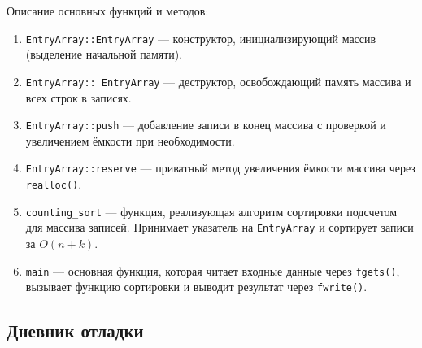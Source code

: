 \documentclass[12pt]{article}
\begin{document}
Описание основных функций и методов:
\begin{enumerate}
\item \texttt{EntryArray::EntryArray} — конструктор, инициализирующий массив (выделение начальной памяти).
\item \texttt{EntryArray::~EntryArray} — деструктор, освобождающий память массива и всех строк в записях.
\item \texttt{EntryArray::push} — добавление записи в конец массива с проверкой и увеличением ёмкости при необходимости.
\item \texttt{EntryArray::reserve} — приватный метод увеличения ёмкости массива через \texttt{realloc()}.
\item \texttt{counting\_sort} — функция, реализующая алгоритм сортировки подсчетом для массива записей. Принимает указатель на \texttt{EntryArray} и сортирует записи за $O(n + k)$.
\item \texttt{main} — основная функция, которая читает входные данные через \texttt{fgets()}, вызывает функцию сортировки и выводит результат через \texttt{fwrite()}.
\end{enumerate}

\subsection*{Дневник отладки}
\end{document}
